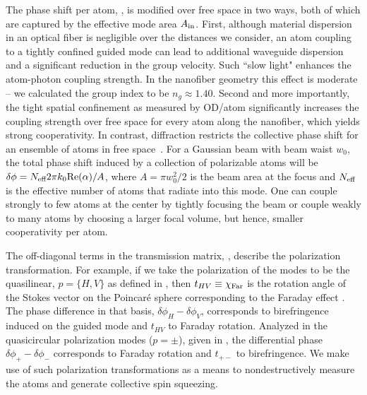 \documentclass[aps,pra,twocolumn]{revtex4-1} %
\newcommand{\comment}[1]{{\color{Maroon} #1}}
\begin{document}
The phase shift per atom, , is modified over free space in two ways, both of which are captured by the effective mode area $A_{\rm in}$. 
First, although material dispersion in an optical fiber is negligible over the distances we consider, an atom coupling to a tightly confined guided mode can lead to additional waveguide dispersion and a significant reduction in the group velocity.  
Such ``slow light" enhances the atom-photon coupling strength. 
In the nanofiber geometry this effect is moderate -- \comment{we calculated the group index to be $n_g \approx 1.40$}. 
Second and more importantly, the tight spatial confinement as measured by OD/atom significantly increases the coupling strength over free space for every atom along the nanofiber, which yields strong cooperativity.
In contrast, diffraction restricts the collective phase shift for an ensemble of atoms in free space~\cite{tanji-suzuki_chapter_2011, baragiola_three-dimensional_2014}.  
For a Gaussian beam with beam waist $w_0$, the total phase shift induced by a collection of polarizable atoms will be $\delta \phi = N_{\text{eff}} 2 \pi k_0 {\rm Re}({\alpha})/A$, where $A = \pi w^2_0/2$ is the beam area at the focus and $N_{\text{eff}}$ is the effective number of atoms that radiate into this mode.  
One can couple strongly to few atoms at the center by tightly focusing the beam or couple weakly to many atoms by choosing a larger focal volume, but hence, smaller cooperativity per atom.  

The off-diagonal terms in the transmission matrix, , describe the polarization transformation. For example, if we take the polarization of the modes to be the quasilinear, $p = \{H,V\}$ as defined in , then $t_{HV} \equiv \chi_{\rm Far}$ is the rotation angle of the Stokes vector on the Poincar\'{e} sphere corresponding to the Faraday effect \cite{hammerer_quantum_2010, deutsch_quantum_2010}.  
The phase difference in that basis, $\delta  \phi_H - \delta \phi_V$, corresponds to birefringence induced on the guided mode and $t_{HV}$ to Faraday rotation.  
Analyzed in the quasicircular polarization modes ($p=\pm$), given in , the differential phase $\delta \phi_+ -\delta  \phi_-$ corresponds to Faraday rotation and $t_{+-}$ to birefringence.  
We make use of such polarization transformations as a means to nondestructively measure the atoms and generate collective spin squeezing.

	
\end{document}
